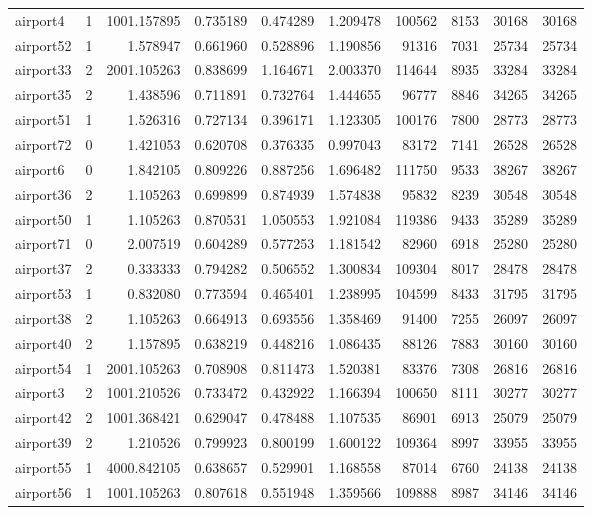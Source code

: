 \documentclass[../../../thesis.tex]{subfiles}
\begin{document}
\begin{longtable}{|l|r|r|r|r|r|r|r|r|r|}
airport4 & 1 & 1001.157895 & 0.735189 & 0.474289 & 1.209478 & 100562 & 8153 & 30168 & 30168 \\
airport52 & 1 & 1.578947 & 0.661960 & 0.528896 & 1.190856 & 91316 & 7031 & 25734 & 25734 \\
airport33 & 2 & 2001.105263 & 0.838699 & 1.164671 & 2.003370 & 114644 & 8935 & 33284 & 33284 \\
airport35 & 2 & 1.438596 & 0.711891 & 0.732764 & 1.444655 & 96777 & 8846 & 34265 & 34265 \\
airport51 & 1 & 1.526316 & 0.727134 & 0.396171 & 1.123305 & 100176 & 7800 & 28773 & 28773 \\
airport72 & 0 & 1.421053 & 0.620708 & 0.376335 & 0.997043 & 83172 & 7141 & 26528 & 26528 \\
airport6 & 0 & 1.842105 & 0.809226 & 0.887256 & 1.696482 & 111750 & 9533 & 38267 & 38267 \\
airport36 & 2 & 1.105263 & 0.699899 & 0.874939 & 1.574838 & 95832 & 8239 & 30548 & 30548 \\
airport50 & 1 & 1.105263 & 0.870531 & 1.050553 & 1.921084 & 119386 & 9433 & 35289 & 35289 \\
airport71 & 0 & 2.007519 & 0.604289 & 0.577253 & 1.181542 & 82960 & 6918 & 25280 & 25280 \\
airport37 & 2 & 0.333333 & 0.794282 & 0.506552 & 1.300834 & 109304 & 8017 & 28478 & 28478 \\
airport53 & 1 & 0.832080 & 0.773594 & 0.465401 & 1.238995 & 104599 & 8433 & 31795 & 31795 \\
airport38 & 2 & 1.105263 & 0.664913 & 0.693556 & 1.358469 & 91400 & 7255 & 26097 & 26097 \\
airport40 & 2 & 1.157895 & 0.638219 & 0.448216 & 1.086435 & 88126 & 7883 & 30160 & 30160 \\
airport54 & 1 & 2001.105263 & 0.708908 & 0.811473 & 1.520381 & 83376 & 7308 & 26816 & 26816 \\
airport3 & 2 & 1001.210526 & 0.733472 & 0.432922 & 1.166394 & 100650 & 8111 & 30277 & 30277 \\
airport42 & 2 & 1001.368421 & 0.629047 & 0.478488 & 1.107535 & 86901 & 6913 & 25079 & 25079 \\
airport39 & 2 & 1.210526 & 0.799923 & 0.800199 & 1.600122 & 109364 & 8997 & 33955 & 33955 \\
airport55 & 1 & 4000.842105 & 0.638657 & 0.529901 & 1.168558 & 87014 & 6760 & 24138 & 24138 \\
airport56 & 1 & 1001.105263 & 0.807618 & 0.551948 & 1.359566 & 109888 & 8987 & 34146 & 34146 \\

\end{longtable}
\end{document}
